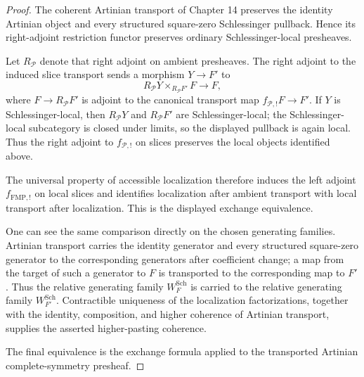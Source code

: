\begin{proof}
The coherent Artinian transport of Chapter 14 preserves the identity Artinian
object and every structured square-zero Schlessinger pullback.  Hence its
right-adjoint restriction functor preserves ordinary Schlessinger-local presheaves.

Let $R_{\mathcal P}$ denote that right adjoint on ambient presheaves.  The right
adjoint to the induced slice transport sends a morphism $Y\to F'$ to
\[
R_{\mathcal P}Y
\times_{R_{\mathcal P}F'}
F
\longrightarrow
F,
\]
where $F\to R_{\mathcal P}F'$ is adjoint to the canonical transport map
$f_{\mathcal P,!}F\to F'$.  If $Y$ is Schlessinger-local, then
$R_{\mathcal P}Y$ and $R_{\mathcal P}F'$ are Schlessinger-local; the
Schlessinger-local subcategory is closed under limits, so the displayed pullback is
again local.  Thus the right adjoint to $f_{\mathcal P,!}$ on slices preserves the
local objects identified above.

The universal property of accessible localization therefore induces the left
adjoint $f_{\mathrm{FMP},!}$ on local slices and identifies localization after
ambient transport with local transport after localization.  This is the displayed
exchange equivalence.

One can see the same comparison directly on the chosen generating families.
Artinian transport carries the identity generator and every structured
square-zero generator to the corresponding generators after coefficient change;
a map from the target of such a generator to $F$ is transported to the
corresponding map to $F'$.  Thus the relative generating family
$W_F^{\mathrm{Sch}}$ is carried to the relative generating family
$W_{F'}^{\mathrm{Sch}}$.  Contractible uniqueness of the localization
factorizations, together with the identity, composition, and higher coherence of
Artinian transport, supplies the asserted higher-pasting coherence.

The final equivalence is the exchange formula applied to the transported
Artinian complete-symmetry presheaf.
\end{proof}

